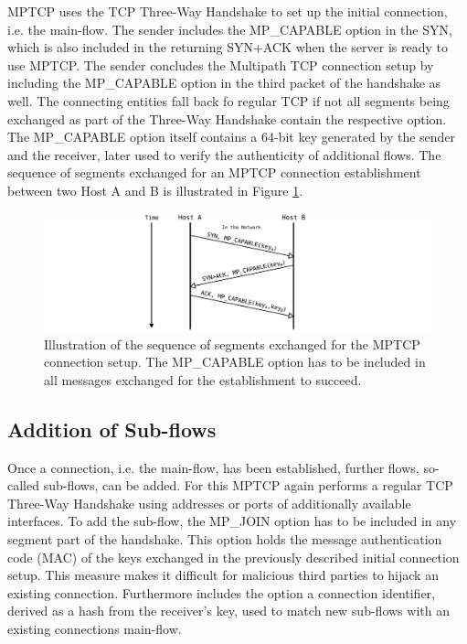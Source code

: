 MPTCP uses the TCP Three-Way Handshake to set up the initial connection, i.e. the main-flow. The sender includes the MP\_CAPABLE option in the SYN, which is also included in the returning SYN+ACK when the server is ready to use MPTCP. The sender concludes the Multipath TCP connection setup by including the MP\_CAPABLE option in the third packet of the handshake as well. The connecting entities fall back fo regular TCP if not all segments being exchanged as part of the Three-Way Handshake contain the respective option. The MP\_CAPABLE option itself contains a 64-bit key generated by the sender and the receiver, later used to verify the authenticity of additional flows. The sequence of segments exchanged for an MPTCP connection establishment between two Host A and B is illustrated in Figure \ref{fig:MTCPConnectionEstablishment}.

\begin{figure}[H]
	\begin{center} 
		\def\svgwidth{1\textwidth}
		\includegraphics[scale=0.24]{../illustrations/importantConcepts/MPTCPHandshake.pdf} 
		\caption[Caption for the list of figures.]{Illustration of the sequence of segments exchanged for the MPTCP connection setup. The MP\_CAPABLE option has to be included in all messages exchanged for the establishment to succeed.}
		\label{fig:MTCPConnectionEstablishment}
	\end{center}
\end{figure}

\subsection*{Addition of Sub-flows}

Once a connection, i.e. the main-flow, has been established, further flows, so-called sub-flows, can be added. For this MPTCP again performs a regular TCP Three-Way Handshake using addresses or ports of additionally available interfaces. To add the sub-flow, the MP\_JOIN option has to be included in any segment part of the handshake. This option holds the message authentication code (MAC) of the keys exchanged in the previously described initial connection setup. This measure makes it difficult for malicious third parties to hijack an existing connection. Furthermore includes the option a connection identifier, derived as a hash from the receiver's key, used to match new sub-flows with an existing connections main-flow. 

